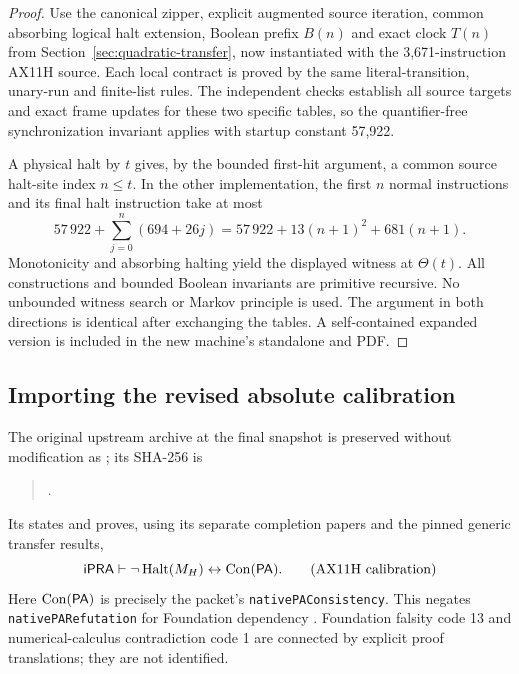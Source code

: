 \begin{proof}
Use the canonical zipper, explicit augmented source iteration, common
absorbing logical halt extension, Boolean prefix $B(n)$ and exact
clock $T(n)$ from Section~\ref{sec:quadratic-transfer}, now instantiated
with the 3,671-instruction AX11H source. Each local contract is proved by
the same literal-transition, unary-run and finite-list rules. The
independent checks establish all source targets and exact frame updates
for these two specific tables, so the quantifier-free synchronization
invariant applies with startup constant 57,922.

A physical halt by $t$ gives, by the bounded first-hit argument, a
common source halt-site index $n\le t$. In the other implementation,
the first $n$ normal instructions and its final halt instruction take
at most
\[
57\,922+\sum_{j=0}^{n}(694+26j)
=57\,922+13(n+1)^2+681(n+1).
\]
Monotonicity and absorbing halting yield the displayed witness at
$\Theta(t)$. All constructions and bounded Boolean invariants are
primitive recursive. No unbounded witness search or Markov principle
is used. The argument in both directions is identical after exchanging
the tables. A self-contained expanded version is included in the new
machine's standalone  and PDF.
\end{proof}

\subsection{Importing the revised absolute calibration}

The original upstream archive at the final snapshot is preserved without
modification as
; its SHA-256 is
\begin{quote}\small
{}.
\end{quote}
Its  states and proves, using its
separate completion papers and the pinned generic transfer results,
\[
 \mathsf{iPRA}\vdash\neg\operatorname{Halt}(M_H)\leftrightarrow\operatorname{Con}(\mathsf{PA}).
 \tag{AX11H calibration}
\]
Here $\operatorname{Con}(\mathsf{PA})$ is precisely the packet's
\texttt{nativePAConsistency}. This negates \texttt{nativePARefutation}
for Foundation dependency
.
Foundation falsity code 13 and numerical-calculus contradiction code 1
are connected by explicit proof translations; they are not identified.
\cite{latest-ax11h}

